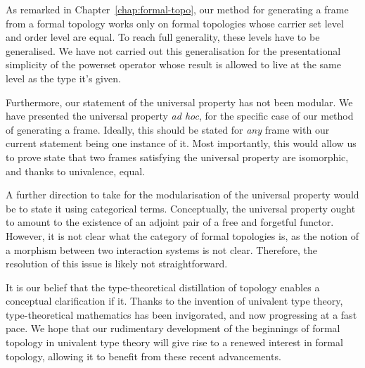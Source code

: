 As remarked in Chapter~\ref{chap:formal-topo}, our method for generating a frame from a
formal topology works only on formal topologies whose carrier set level and order level
are equal. To reach full generality, these levels have to be generalised. We have not
carried out this generalisation for the presentational simplicity of the powerset operator
whose result is allowed to live at the same level as the type it's given.

Furthermore, our statement of the universal property has not been modular. We have
presented the universal property \emph{ad hoc}, for the specific case of our method of
generating a frame. Ideally, this should be stated for \emph{any} frame with our current
statement being one instance of it. Most importantly, this would allow us to prove state
that two frames satisfying the universal property are isomorphic, and thanks to
univalence, equal.

A further direction to take for the modularisation of the universal property would be to
state it using categorical terms. Conceptually, the universal property ought to amount to
the existence of an adjoint pair of a free and forgetful functor. However, it is not clear
what the category of formal topologies is, as the notion of a morphism between two
interaction systems is not clear. Therefore, the resolution of this issue is likely not
straightforward.

It is our belief that the type-theoretical distillation of topology enables a conceptual
clarification if it. Thanks to the invention of univalent type theory, type-theoretical
mathematics has been invigorated, and now progressing at a fast pace. We hope that our
rudimentary development of the beginnings of formal topology in univalent type theory will
give rise to a renewed interest in formal topology, allowing it to benefit from these
recent advancements.

